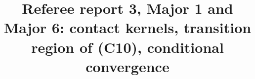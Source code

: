 
\usepackage{booktabs}

\title{Referee report 3, Major 1 and Major 6: contact kernels, transition region of (C10), conditional convergence}\date{}\author{}\maketitle



